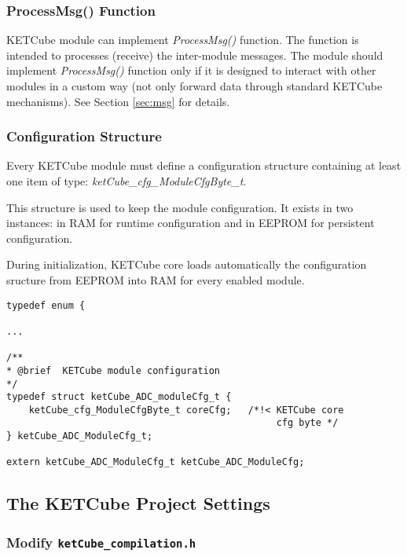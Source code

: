 \subsubsection*{ProcessMsg() Function}
KETCube module can implement {\it ProcessMsg()} function. The function is intended to processes (receive) the inter-module messages. The module should implement {\it ProcessMsg()} function only if it is designed to interact with other modules in a custom way (not only forward data through standard KETCube mechanisms). See Section \ref{sec:msg} for details.

\subsubsection*{Configuration Structure}
Every KETCube module must define a configuration structure containing at least one item of type: {\it ketCube\_cfg\_ModuleCfgByte\_t}.

This structure is used to keep the module configuration. It exists in two instances: in RAM for runtime configuration and in EEPROM for persistent configuration. 

During initialization, KETCube core loads automatically the configuration sructure from EEPROM into RAM for every enabled module.

\begin{docCodeExample}
\begin{verbatim}
typedef enum {

...

/**
* @brief  KETCube module configuration
*/
typedef struct ketCube_ADC_moduleCfg_t {
    ketCube_cfg_ModuleCfgByte_t coreCfg;   /*!< KETCube core 
                                                cfg byte */
} ketCube_ADC_ModuleCfg_t;

extern ketCube_ADC_ModuleCfg_t ketCube_ADC_ModuleCfg;
\end{verbatim}
\end{docCodeExample}

\clearpage
\subsection{The KETCube Project Settings}\label{sec:creation:core}

\subsubsection*{Modify {\tt ketCube\_compilation.h}}\label{sec:creation:core:cfg}

